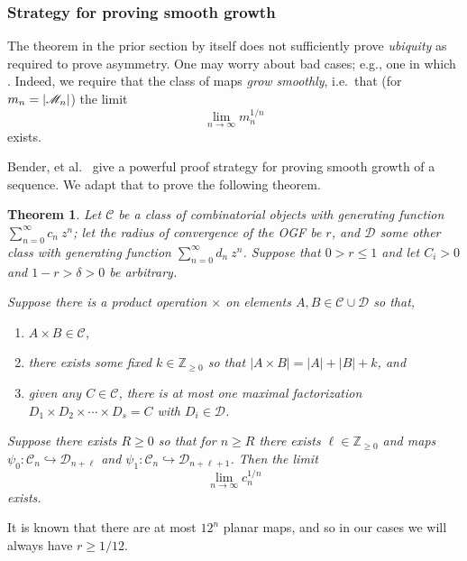 \documentclass[amsmath,longbibliography,secnumarabic,floatfix,amssymb,nofootinbib,nobibnotes,letterpaper,11pt,notitlepage,tightenlines]{revtex4-1}
\newcommand{\Z}{\mathbb{Z}} \newcommand{\N}{\mathbb{N}}
\newcommand{\ArbClass}{\mathscr{C}}
\newcommand{\ArbSubClass}{\mathscr{D}}
\newcommand{\arbsubclass}{d}
\newcommand{\arbclass}{c}
\newtheorem{theorem}{Theorem}
\begin{document}
\subsubsection{Strategy for proving smooth growth}
\label{sec:smoothstratproof}

The theorem in the prior section by itself does not sufficiently prove \emph{ubiquity} as required
to prove asymmetry. One may worry about bad cases; e.g., one in which . Indeed, we require that the
class of maps \emph{grow smoothly}, i.e.\ that (for $m_n = |\mathscr{M}_n|$) the limit
\[ \lim_{n\to\infty}{m_n^{1/n}} \] exists.

Bender, et al.\ \cite{Bender1992104} give a powerful proof strategy for proving smooth growth of a
sequence. We adapt that to prove the following theorem.

\begin{theorem}
  Let $\ArbClass$ be a class of combinatorial objects with generating function
  $\sum_{n=0}^{\infty}{\arbclass_n~z^n}$; let the radius of convergence of the OGF be $r$, and
  $\ArbSubClass$ some other class with generating function
  $\sum_{n=0}^{\infty}{\arbsubclass_n~z^n}$. Suppose that $0 > r \le 1$ and let $C_i > 0$ and
  $1-r>\delta>0$ be arbitrary.

  Suppose there is a product operation $\times$ on elements $A, B \in
  \ArbClass \cup \ArbSubClass$ so that,
  \begin{enumerate}
  \item $A \times B \in \ArbClass$,
  \item there exists some fixed $k \in \Z_{\ge 0}$ so that $|A \times B| = |A| + |B| + k$, and
  \item given any $C \in \ArbClass$, there is at most one maximal factorization $D_1 \times D_2 \times
    \cdots \times D_s = C$ with $D_i \in \ArbSubClass$.
  \end{enumerate}
  Suppose there exists $R \ge 0$ so that for $n \ge R$ there exists $\ell \in \Z_{\ge 0}$ and maps $\psi_0:
  \ArbClass_n \hookrightarrow \ArbSubClass_{n+\ell}$ and $ \psi_1: \ArbClass_n \hookrightarrow
  \ArbSubClass_{n+\ell+1}$. Then the limit
  \[ \lim_{n\to\infty}{\arbclass_n^{1/n}} \] exists.
\end{theorem}

It is known that there are at most $12^n$ planar maps, and so in our cases we will always have $r
\ge 1/12$.
\end{document}
